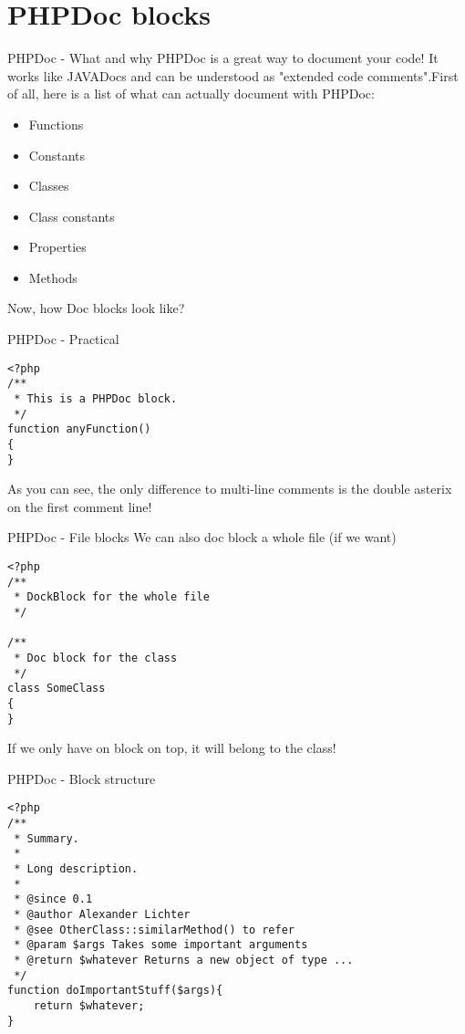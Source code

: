 \section{PHPDoc blocks}

\begin{frame}[fragile]{PHPDoc - What and why}
	PHPDoc is a great way to document your code! It works like JAVADocs and can be understood as "extended code comments".\pause First of all, here is a list of what can actually document with PHPDoc:
	\begin{itemize}
	    \item Functions
	    \item Constants
	    \item Classes
	    \item Class constants
	    \item Properties
	    \item Methods
	\end{itemize}
	\pause
	
	Now, how Doc blocks look like?
\end{frame}

\begin{frame}[fragile]{PHPDoc - Practical}
\begin{lstlisting}
<?php
/**
 * This is a PHPDoc block.
 */
function anyFunction()
{
}
\end{lstlisting}
\pause
As you can see, the only difference to multi-line comments is the double asterix on the first comment line!\pause
\end{frame}

\begin{frame}[fragile]{PHPDoc - File blocks}
We can also doc block a whole file (if we want) \pause
\begin{lstlisting}
<?php
/**
 * DockBlock for the whole file
 */

/**
 * Doc block for the class
 */
class SomeClass
{
}
\end{lstlisting}
\pause

If we only have on block on top, it will belong to the class!
\end{frame}

\begin{frame}[fragile]{PHPDoc - Block structure}
\begin{lstlisting}
<?php
/**
 * Summary.
 *
 * Long description.
 *
 * @since 0.1
 * @author Alexander Lichter
 * @see OtherClass::similarMethod() to refer
 * @param $args Takes some important arguments
 * @return $whatever Returns a new object of type ...
 */
function doImportantStuff($args){
    return $whatever;
}
\end{lstlisting}
\end{frame}

